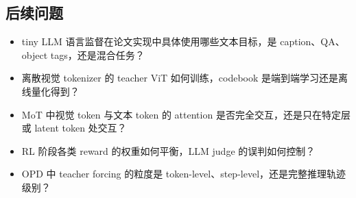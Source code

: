 \subsection{后续问题}

\begin{itemize}
    \item tiny LLM 语言监督在论文实现中具体使用哪些文本目标，是 caption、QA、object tags，还是混合任务？
    \item 离散视觉 tokenizer 的 teacher ViT 如何训练，codebook 是端到端学习还是离线量化得到？
    \item MoT 中视觉 token 与文本 token 的 attention 是否完全交互，还是只在特定层或 latent token 处交互？
    \item RL 阶段各类 reward 的权重如何平衡，LLM judge 的误判如何控制？
    \item OPD 中 teacher forcing 的粒度是 token-level、step-level，还是完整推理轨迹级别？
\end{itemize}
